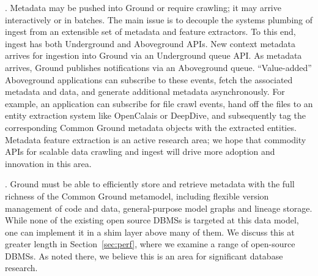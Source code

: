 \documentclass{sig-alternate}
\begin{document}
.  Metadata may be pushed into Ground or require crawling; it may arrive interactively or in batches. 
The main issue is to decouple the systems plumbing of ingest from an extensible set of metadata and feature extractors.
To this end, ingest has both Underground and Aboveground APIs.
New context metadata arrives for ingestion into Ground via an Underground queue API. 
As metadata arrives, Ground publishes notifications via an Aboveground queue. ``Value-added'' Aboveground applications can subscribe to these events, fetch the associated metadata and data, and generate additional metadata asynchronously. 
For example, an application can subscribe for file crawl events, hand off the files to an entity extraction system like OpenCalais or DeepDive, and subsequently tag the corresponding Common Ground metadata objects with  the extracted entities.
Metadata feature extraction is an active research area; we hope that commodity APIs for scalable data crawling and ingest will drive more adoption and innovation in this area. 

.  Ground must be able to efficiently store and retrieve metadata with the full richness of the Common Ground metamodel, including flexible version management of code and data, general-purpose model graphs and lineage storage. 
While none of the existing open source DBMSs is targeted at this data model, one can implement it in a shim layer above many of them. We discuss this at greater length in Section~\ref{sec:perf}, where we examine a range of open-source DBMSs. As noted there, we believe this is an area for significant database research.
\end{document}
